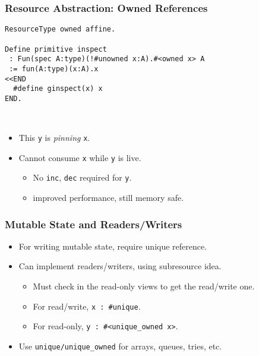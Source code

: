 \documentclass[10pt]{beamer}
\begin{document}
\begin{frame}[containsverbatim]
\frametitle{Resource Abstraction: Owned References}
{
\footnotesize
\begin{verbatim}
ResourceType owned affine.

Define primitive inspect
 : Fun(spec A:type)(!#unowned x:A).#<owned x> A 
 := fun(A:type)(x:A).x
<<END
  #define ginspect(x) x
END.
\end{verbatim}
}
\ \ \ \ \ \ \ \ \ \ \ \ 

\begin{itemize}
\item This \texttt{y} is \emph{pinning} \texttt{x}.
\item Cannot consume \texttt{x} while \texttt{y} is live.
\begin{itemize}
\item No \texttt{inc}, \texttt{dec} required for \texttt{y}.
\item improved performance, still memory safe.
\end{itemize}
\end{itemize}

\end{frame}

\begin{frame}
\frametitle{Mutable State and Readers/Writers}
\begin{itemize}
\item For writing mutable state, require unique reference.
\item Can implement readers/writers, using subresource idea.
\begin{itemize}
\item Must check in the read-only views to get the read/write one.
\item For read/write, \texttt{x\,:\,\texttt{\#unique}}.
\item For read-only, \texttt{y\,:\,\texttt{\#<unique\_owned x>}}.
\end{itemize}
\item Use \texttt{unique/unique\_owned} for arrays, queues, tries, etc.
\end{itemize}
\end{frame}
\end{document}
